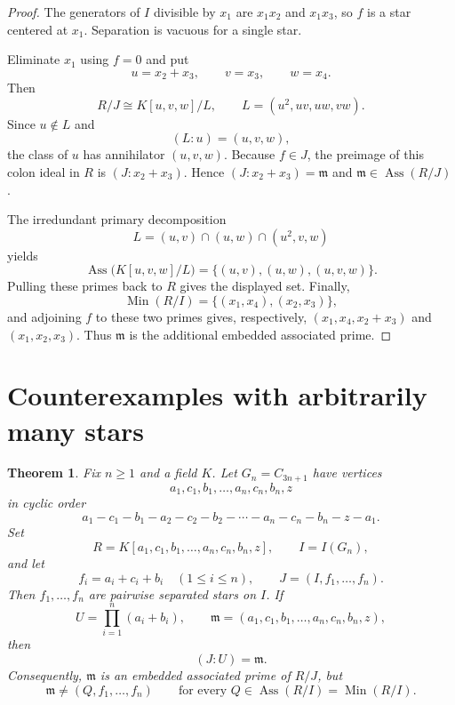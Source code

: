 \documentclass[11pt]{amsart}
\newtheorem{theorem}{Theorem}
\theoremstyle{remark}
\DeclareMathOperator{\Ass}{Ass}
\DeclareMathOperator{\Min}{Min}
\begin{document}
\begin{proof}
The generators of $I$ divisible by $x_1$ are $x_1x_2$ and
$x_1x_3$, so $f$ is a star centered at $x_1$. Separation is
vacuous for a single star.

Eliminate $x_1$ using $f=0$ and put
\[
 u=x_2+x_3,\qquad v=x_3,\qquad w=x_4.
\]
Then
\[
 R/J\cong K[u,v,w]/L,
 \qquad L=(u^2,uv,uw,vw).
\]
Since $u\notin L$ and
\[
 (L:u)=(u,v,w),
\]
the class of $u$ has annihilator $(u,v,w)$. Because $f\in J$,
the preimage of this colon ideal in $R$ is $(J:x_2+x_3)$. Hence
$(J:x_2+x_3)=\mathfrak m$ and
$\mathfrak m\in\Ass(R/J)$.

The irredundant primary decomposition
\[
 L=(u,v)\cap(u,w)\cap(u^2,v,w)
\]
yields
\[
 \Ass\bigl(K[u,v,w]/L\bigr)
 =\{(u,v),(u,w),(u,v,w)\}.
\]
Pulling these primes back to $R$ gives the displayed set.
Finally,
\[
 \Min(R/I)=\{(x_1,x_4),(x_2,x_3)\},
\]
and adjoining $f$ to these two primes gives, respectively,
$(x_1,x_4,x_2+x_3)$ and $(x_1,x_2,x_3)$. Thus
$\mathfrak m$ is the additional embedded associated prime.
\end{proof}

\section{Counterexamples with arbitrarily many stars}

\begin{theorem}\label{thm:family}
Fix $n\geq 1$ and a field $K$. Let $G_n=C_{3n+1}$ have vertices
\[
 a_1,c_1,b_1,\ldots,a_n,c_n,b_n,z
\]
in cyclic order
\[
 a_1-c_1-b_1-a_2-c_2-b_2-\cdots-a_n-c_n-b_n-z-a_1.
\]
Set
\[
 R=K[a_1,c_1,b_1,\ldots,a_n,c_n,b_n,z],
 \qquad I=I(G_n),
\]
and let
\[
 f_i=a_i+c_i+b_i\quad(1\leq i\leq n),
 \qquad J=(I,f_1,\ldots,f_n).
\]
Then $f_1,\ldots,f_n$ are pairwise separated stars on $I$. If
\[
 U=\prod_{i=1}^n(a_i+b_i),
 \qquad
 \mathfrak m=(a_1,c_1,b_1,\ldots,a_n,c_n,b_n,z),
\]
then
\[
 (J:U)=\mathfrak m.
\]
Consequently, $\mathfrak m$ is an embedded associated prime of
$R/J$, but
\[
 \mathfrak m\neq(Q,f_1,\ldots,f_n)
 \qquad\text{for every }Q\in\Ass(R/I)=\Min(R/I).
\]
\end{theorem}
\end{document}
